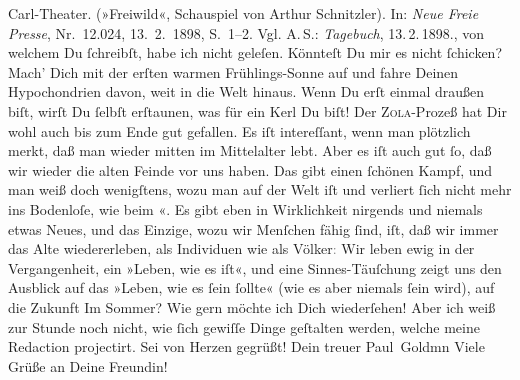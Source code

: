 \begin{ledgroupsized}[t]{13cm}
{{{{                        Carl-Theater. (»Freiwild«, Schauspiel von Arthur Schnitzler)}. In: \emph{Neue Freie Presse}, Nr. 12.024, 13. 2. 1898, S. 1–2. Vgl. A. S.: \emph{Tagebuch}, 13. 2. 1898.}}}\label{K_L02839-8h}, von
               welchem Du ſchreibſt, habe ich nicht geleſen. Könnteſt Du mir es nicht ſchicken?\pend
           \pstart
           Mach’ Dich mit der erſten warmen Frühlings-Sonne auf und fahre Deinen Hypochondrien
               davon, weit in die Welt hinaus. Wenn Du erſt einmal draußen biſt, wirſt Du ſelbſt
               erſtaunen, was für ein Kerl Du biſt!\pend
           \pstart
           Der \textsc{Zola}-Prozeß hat Dir wohl auch bis zum Ende gut gefallen. Es iſt intereſſant,  wenn man plötzlich merkt, daß man wieder mitten im
               Mittelalter lebt. Aber es iſt auch gut ſo, daß \strikeout{\textcolor{gray}{w}} wir wieder die alten Feinde vor uns haben.  Das gibt einen ſchönen Kampf, und {\pb}man weiß
               doch wenigſtens, \strikeout{\textcolor{gray}{e}} wozu man auf der Welt iſt und verliert ſich nicht mehr ins Bodenloſe, wie beim
                  \label{K_L02839-9v}\label{K_L02839-9h}«. Es gibt eben in Wirklichkeit nirgends  und
               niemals etwas Neues, und das Einzige, wozu wir Menſchen fähig ſind, iſt, daß wir
               immer das Alte wiedererleben, als Individuen wie als Völker\textcolor{gray}{:} Wir
               leben ewig in der Vergangenheit, ein »Leben, wie es iſt«, und eine Sinnes-Täuſchung
               zeigt uns den Ausblick auf das »Leben, wie es ſein ſollte« (wie es aber niemals ſein
               wird),  auf die Zukunft{\dotsfive}\pend
           \pstart
           Im Sommer? Wie gern möchte ich Dich wiederſehen! Aber ich weiß zur Stunde noch nicht,
               wie ſich gewiſſe Dinge geſtalten werden, welche meine Redaction projectirt. Sei von Herzen
               gegrüßt!\pend
           \pstart Dein treuer \spacefill\mbox{Paul Goldmn}\pend{}\pstart
           \noindent{}Viele Grüße an Deine Freundin!\pend
           

\end{ledgroupsized}
